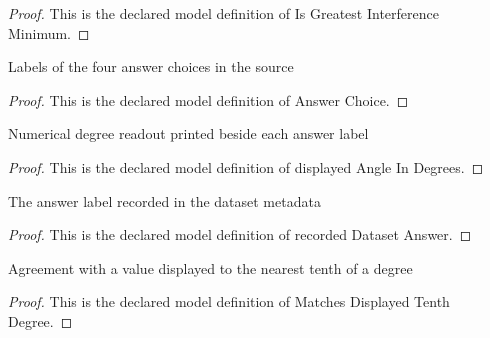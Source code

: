 \begin{proof}
  This is the declared model definition of Is Greatest Interference Minimum.
\end{proof}
\begin{definition}
  \label{def:physics:phyx-mini-0924:phyxminiproblems-problemphyxmini0924-answerchoice}
  Labels of the four answer choices in the source
\end{definition}
\begin{proof}
  This is the declared model definition of Answer Choice.
\end{proof}
\begin{definition}
  \label{def:physics:phyx-mini-0924:phyxminiproblems-problemphyxmini0924-displayedangleindegrees}
  Numerical degree readout printed beside each answer label
\end{definition}
\begin{proof}
  This is the declared model definition of displayed Angle In Degrees.
\end{proof}
\begin{definition}
  \label{def:physics:phyx-mini-0924:phyxminiproblems-problemphyxmini0924-recordeddatasetanswer}
  The answer label recorded in the dataset metadata
\end{definition}
\begin{proof}
  This is the declared model definition of recorded Dataset Answer.
\end{proof}
\begin{definition}
  \label{def:physics:phyx-mini-0924:phyxminiproblems-problemphyxmini0924-matchesdisplayedtenthdegree}
  Agreement with a value displayed to the nearest tenth of a degree
\end{definition}
\begin{proof}
  This is the declared model definition of Matches Displayed Tenth Degree.
\end{proof}

